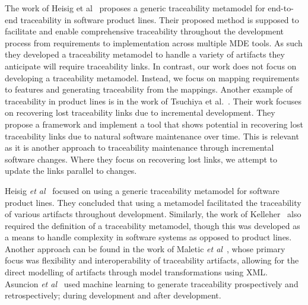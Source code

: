 The work of Heisig et al~\cite{heisig2019generic} proposes a generic traceability metamodel for end-to-end traceability in software product lines. Their proposed method is supposed to facilitate and enable comprehensive traceability throughout the development process from requirements to implementation across multiple MDE tools. As such they developed a traceability metamodel to handle a variety of artifacts they anticipate will require traceability links. In contrast, our work does not focus on developing a traceability metamodel. Instead, we focus on mapping requirements to features and generating traceability from the mappings. Another example of traceability in product lines is in the work of Tsuchiya et al.~\cite{tsuchiya2013recovering}. Their work focuses on recovering lost traceability links due to incremental development. They propose a framework and implement a tool that shows potential in recovering lost traceability links due to natural software maintenance over time. This is relevant as it is another approach to traceability maintenance through incremental software changes. Where they focus on recovering lost links, we attempt to update the links parallel to changes.

Heisig \textit{\textit{et al}}~\cite{heisig2019generic} focused on using a generic traceability metamodel for software product lines. They concluded that using a metamodel facilitated the traceability of various artifacts throughout development. Similarly, the work of Kelleher~\cite{kelleher2005reusable} also required the definition of a traceability metamodel, though this was developed as a means to handle complexity in software systems as opposed to product lines. Another approach can be found in the work of Maletic \textit{\textit{et al}}~\cite{maletic2005xml}, whose primary focus was flexibility and interoperability of traceability artifacts, allowing for the direct modelling of artifacts through model transformations using XML. Asuncion \textit{\textit{et al}}~\cite{asuncion2010software} used machine learning to generate traceability prospectively and retrospectively; during development and after development.